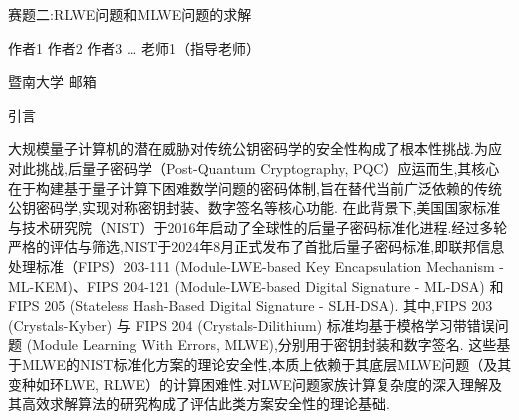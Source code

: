 \documentclass[12pt,a4paper]{article}
\newcommand{\fs}{\CJKfamily{fs}}
\numberwithin{equation}{section}
\begin{document}
\begin{center}
	{\heiti\fontsize{16pt}{24pt}\selectfont 赛题二:RLWE问题和MLWE问题的求解}
\end{center}

\begin{center}
	{\fs\fontsize{12pt}{18pt}\selectfont 作者1 作者2 作者3 … 老师1（指导老师）}
\end{center}

\begin{center}
	{\songti\fontsize{10.5pt}{15.75pt}\selectfont 暨南大学 \; 邮箱}
\end{center}

\vspace{1em}




\vspace{1em}


\vspace{2em}

{\centering\heiti\fontsize{16pt}{24pt}\selectfont 引言\par}
\vspace{1em}


大规模量子计算机的潜在威胁对传统公钥密码学的安全性构成了根本性挑战.为应对此挑战,后量子密码学（Post-Quantum Cryptography, PQC）应运而生,其核心在于构建基于量子计算下困难数学问题的密码体制,旨在替代当前广泛依赖的传统公钥密码学,实现对称密钥封装、数字签名等核心功能.
在此背景下,美国国家标准与技术研究院（NIST）于2016年启动了全球性的后量子密码标准化进程.经过多轮严格的评估与筛选,NIST于2024年8月正式发布了首批后量子密码标准,即联邦信息处理标准（FIPS）203-111 (Module-LWE-based Key Encapsulation Mechanism - ML-KEM)、FIPS 204-121 (Module-LWE-based Digital Signature - ML-DSA) 和 FIPS 205 (Stateless Hash-Based Digital Signature - SLH-DSA).
其中,FIPS 203 (Crystals-Kyber) 与 FIPS 204 (Crystals-Dilithium) 标准均基于模格学习带错误问题 (Module Learning With Errors, MLWE),分别用于密钥封装和数字签名.
这些基于MLWE的NIST标准化方案的理论安全性,本质上依赖于其底层MLWE问题（及其变种如环LWE, RLWE）的计算困难性.对LWE问题家族计算复杂度的深入理解及其高效求解算法的研究构成了评估此类方案安全性的理论基础.
\end{document}
